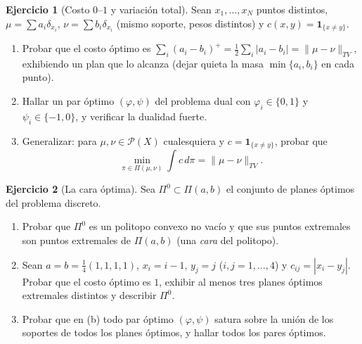 \documentclass[11pt,a4paper]{amsart}
\newcounter{chapter}
\newcommand{\I}{{\mathbf 1}}
\theoremstyle{remark}
\theoremstyle{definition}
\newtheorem{ejercicio}{Ejercicio}[chapter]
\numberwithin{subsection}{section}
\numberwithin{equation}{section}
\begin{document}
\begin{ejercicio}[Costo $0$--$1$ y variación total]\label{ejer.discreto.01}
Sean $x_1,\dots,x_N$ puntos distintos, $\mu=\sum a_i\delta_{x_i}$,
$\nu=\sum b_i\delta_{x_i}$ (mismo soporte, pesos distintos) y
$c(x,y)=\I_{\{x\ne y\}}$.
\begin{enumerate}[label=(\alph*)]
\item Probar que el costo óptimo es
$\sum_i(a_i-b_i)^+=\tfrac12\sum_i|a_i-b_i|=\|\mu-\nu\|_{TV}$, exhibiendo un
plan que lo alcanza (dejar quieta la masa $\min\{a_i,b_i\}$ en cada punto).
\item Hallar un par óptimo $(\varphi,\psi)$ del problema dual con
$\varphi_i\in\{0,1\}$ y $\psi_i\in\{-1,0\}$, y verificar la dualidad fuerte.
\item Generalizar: para $\mu,\nu\in\mathcal P(X)$ cualesquiera y
$c=\I_{\{x\ne y\}}$, probar que
\[
\min_{\pi\in\Pi(\mu,\nu)}\int c\,d\pi=\|\mu-\nu\|_{TV}.
\]
\end{enumerate}
\end{ejercicio}

\begin{ejercicio}[La cara óptima]\label{ejer.discreto.cara}
Sea $\Pi^0\subset\Pi(a,b)$ el conjunto de planes óptimos del problema
discreto.
\begin{enumerate}[label=(\alph*)]
\item Probar que $\Pi^0$ es un politopo convexo no vacío y que sus puntos
extremales son puntos extremales de $\Pi(a,b)$ (una \emph{cara} del
politopo).
\item Sean $a=b=\frac14(1,1,1,1)$, $x_i=i-1$, $y_j=j$ ($i,j=1,\dots,4$) y
$c_{ij}=|x_i-y_j|$. Probar que el costo óptimo es $1$, exhibir al menos tres
planes óptimos extremales distintos y describir $\Pi^0$.
\item Probar que en (b) todo par óptimo $(\varphi,\psi)$ satura sobre la
unión de los soportes de todos los planes óptimos, y hallar todos los pares
óptimos.
\end{enumerate}
\end{ejercicio}
\end{document}
